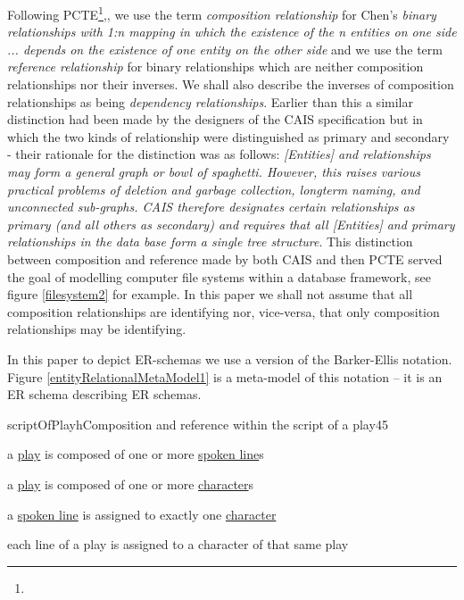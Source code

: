 \documentclass[10pt,a4paper]{article}
\begin{document}
\noindent Following PCTE\footnote{ 
}\cite{Boudier1988},\cite{ECMA-149}, 
we use the term \textit{composition relationship} for Chen's \textit{binary relationships with 1:n mapping in which the existence of the n entities
on one side ... depends on the existence of one entity on the other side} and we use the term \textit{reference relationship} for binary relationships which are neither composition relationships nor their inverses. We shall also describe the inverses of composition relationships as being \textit{dependency relationships}. Earlier than this a similar distinction 
had been made by the designers of the CAIS specification \cite{Oberndorf88} but in which the two kinds of relationship were distinguished as primary and secondary - their rationale for the distinction \cite{Munck1988} was as follows: \textit{[Entities] and relationships may form a general graph or bowl of spaghetti. However, this raises various practical
problems of deletion and garbage collection, longterm
naming, and unconnected sub-graphs. CAIS
therefore designates certain relationships as primary
(and all others as secondary) and requires that all [Entities]
and primary relationships in the data base form a single
tree structure}. This distinction between composition and reference made by both CAIS and then PCTE served  
the goal of modelling computer file systems within a database framework, see figure \ref{filesystem2} for example. 
\noindent In this paper we shall not assume that all composition relationships are identifying nor, vice-versa, that only composition relationships may be identifying. 

\noindent In this paper to depict ER-schemas we use a version of the Barker-Ellis notation. Figure \ref{entityRelationalMetaModel1} is a meta-model of this notation -- it is an ER schema describing ER schemas.
% 
\begin{erbulletedDimFig}{scriptOfPlay}{h}{Composition and reference within the script of a play}{4}{5}
\item{a \underline{play} is composed of one or more \underline{spoken line}s}
\item{a \underline{play} is composed of one or more \underline{character}s}
\item{a \underline{spoken line} is assigned to exactly one \underline{character}}
\item{each line of a play is assigned to a character of that same play}
\end{erbulletedDimFig} 
%
\end{document}
